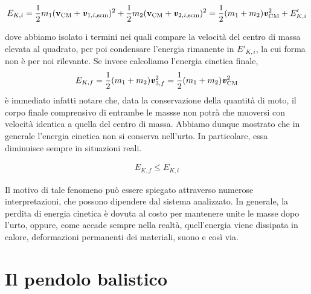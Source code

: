 \[ E_{K,i} = \frac12 m_1(\textbf{v}_\text{CM} + \textbf{\textit{v}}_{1,i,\text{scm}})^2 + \frac12 m_2(\textbf{v}_\text{CM} + \textbf{\textit{v}}_{2,i,\text{scm}})^2 = \frac12(m_1 + m_2)\textbf{\textit{v}}_\text{CM}^2 + E'_{K,i} \]

\noindent dove abbiamo isolato i termini nei quali compare la velocità del centro di massa
elevata al quadrato, per poi condensare l'energia rimanente in $E'_{K,i}$,
la cui forma non è per noi rilevante. Se invece calcoliamo l'energia cinetica
finale,
\[ E_{K,f} = \frac12 (m_1 + m_2)\textbf{\textit{v}}_{3,f}^2 = \frac12(m_1 + m_2)\textbf{\textit{v}}_\text{CM}^2 \]
è immediato infatti notare che, data la conservazione della quantità di moto,
il corpo finale comprensivo di entrambe le massse non potrà che muoversi
con velocità identica a quella del centro di massa.
Abbiamo dunque mostrato che in generale l'energia cinetica non si conserva nell'urto.
In particolare, essa diminuisce sempre in situazioni reali.

\begin{align}
    E_{K,f} \leq E_{K,i}
\end{align}

\noindent Il motivo di tale fenomeno può essere spiegato attraverso numerose
interpretazioni, che possono dipendere dal sistema analizzato. In generale,
la perdita di energia cinetica è dovuta al costo per mantenere unite le
masse dopo l'urto, oppure, come accade sempre nella realtà, quell'energia
viene dissipata in calore, deformazioni permanenti dei materiali, suono e
così via.

\section{Il pendolo balistico}